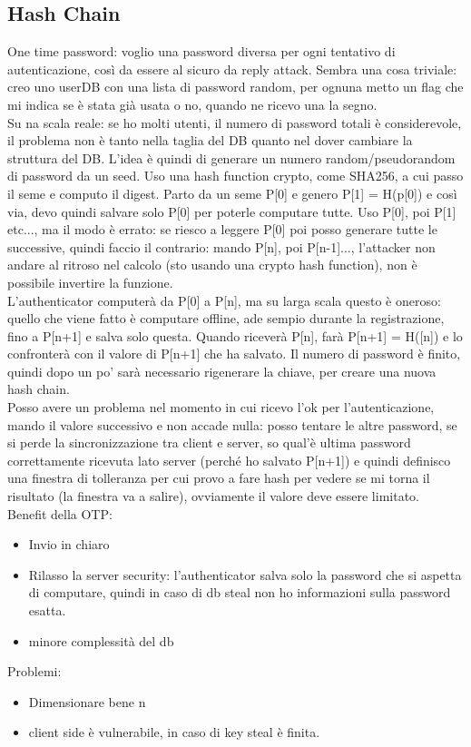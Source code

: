 \documentclass[16px]{article}
\begin{document}
\subsection{Hash Chain}
One time password: voglio una password diversa per ogni tentativo di autenticazione, così da essere al sicuro da reply attack. Sembra una cosa triviale: creo uno userDB con una lista di password random, per ognuna metto un flag che mi indica se è stata già usata o no, quando ne ricevo una la segno.\\ Su na scala reale: se ho molti utenti, il numero di password totali è considerevole, il problema non è tanto nella taglia del DB quanto nel dover cambiare la struttura del DB. L'idea è quindi di generare un numero random/pseudorandom di password da un seed. Uso una hash function crypto, come SHA256, a cui passo il seme e computo il digest. Parto da un seme P[0] e genero P[1] = H(p[0]) e così via, devo quindi salvare solo P[0] per poterle computare tutte. Uso P[0], poi P[1] etc..., ma il modo è errato: se riesco a leggere P[0] poi posso generare tutte le successive, quindi faccio il contrario: mando P[n], poi P[n-1]..., l'attacker non andare al ritroso nel calcolo (sto usando una crypto hash function), non è possibile invertire la funzione.\\ L'authenticator computerà da P[0] a P[n], ma su larga scala questo è oneroso: quello che viene fatto è computare offline, ade sempio durante la registrazione, fino a P[n+1] e salva solo questa. Quando riceverà P[n], farà P[n+1] = H([n]) e lo confronterà con il valore di P[n+1] che ha salvato. Il numero di password è finito, quindi dopo un po' sarà necessario rigenerare la chiave, per creare una nuova hash chain. \\ Posso avere un problema nel momento in cui ricevo l'ok per l'autenticazione, mando il valore successivo e non accade nulla: posso tentare le altre password, se si perde la sincronizzazione tra client e server, so qual'è ultima password correttamente ricevuta lato server (perché ho salvato P[n+1]) e quindi definisco una finestra di tolleranza per cui provo a fare hash per vedere se mi torna il risultato (la finestra va a salire), ovviamente il valore deve essere limitato.\\ Benefit della OTP:
\begin{itemize}
\item Invio in chiaro
\item Rilasso la server security: l'authenticator salva solo la password che si aspetta di computare, quindi in caso di db steal non ho informazioni sulla password esatta.
\item minore complessità del db
\end{itemize}
Problemi:
\begin{itemize}
\item Dimensionare bene n
\item client side è vulnerabile, in caso di key steal è finita.
\end{itemize}
\end{document}
